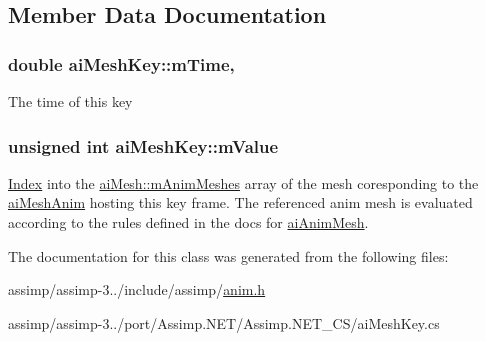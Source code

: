 \subsection{Member Data Documentation}
\hypertarget{structai_mesh_key_a0814e4b14ed162295ba19331410a51ab}{
\subsubsection[{m\+Time}]{\setlength{\rightskip}{0pt plus 5cm}double ai\+Mesh\+Key\+::m\+Time\hspace{0.3cm}{\ttfamily [get]}, {\ttfamily [set]}}}\label{structai_mesh_key_a0814e4b14ed162295ba19331410a51ab}
The time of this key \hypertarget{structai_mesh_key_abdd5914697609a9d876f63b6ca090a18}{
\subsubsection[{m\+Value}]{\setlength{\rightskip}{0pt plus 5cm}unsigned int ai\+Mesh\+Key\+::m\+Value}}\label{structai_mesh_key_abdd5914697609a9d876f63b6ca090a18}
\hyperlink{struct_index}{Index} into the \hyperlink{structai_mesh_a5078f7db7e99ed05db89dfa412f0e990}{ai\+Mesh\+::m\+Anim\+Meshes} array of the mesh coresponding to the \hyperlink{structai_mesh_anim}{ai\+Mesh\+Anim} hosting this key frame. The referenced anim mesh is evaluated according to the rules defined in the docs for \hyperlink{structai_anim_mesh}{ai\+Anim\+Mesh}. 

The documentation for this class was generated from the following files\+:\begin{DoxyCompactItemize}
\item 
assimp/assimp-\/3../include/assimp/\hyperlink{anim_8h}{anim.\+h}\item 
assimp/assimp-\/3../port/\+Assimp.\+N\+E\+T/\+Assimp.\+N\+E\+T\+\_\+\+C\+S/ai\+Mesh\+Key.\+cs\end{DoxyCompactItemize}
